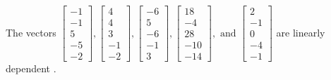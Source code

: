 \begin{exercise}
\begin{exerciseStatement}
  \end{exerciseStatement}
  \begin{exerciseAnswer}
   The vectors \(\left[\begin{array}{r}
-1 \\
-1 \\
5 \\
-5 \\
-2
\end{array}\right] , \left[\begin{array}{r}
4 \\
4 \\
3 \\
-1 \\
-2
\end{array}\right] , \left[\begin{array}{r}
-6 \\
5 \\
-6 \\
-1 \\
3
\end{array}\right] , \left[\begin{array}{r}
18 \\
-4 \\
28 \\
-10 \\
-14
\end{array}\right] , \text{ and } \left[\begin{array}{r}
2 \\
-1 \\
0 \\
-4 \\
-1
\end{array}\right]\) are 
  	 linearly dependent  .
  


  \end{exerciseAnswer}
\end{exercise}